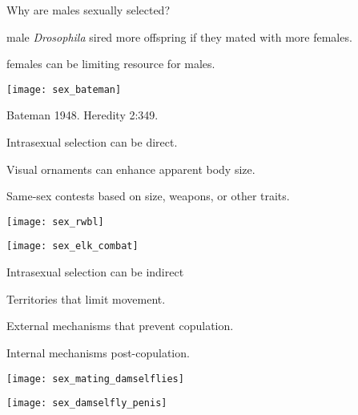 \documentclass[t]{beamer}
\newcommand{\backskip}{\vspace{-0.5\baselineskip}}
\begin{document}

\begin{frame}{Why are males sexually selected?}

\backskip

\begin{multicols}{2}
	\hangpara {} male \textit{Drosophila} sired more offspring if they mated with more females.

	\hangpara {} females can be limiting resource for males.

	\hangpara {}
	
\columnbreak

\texttt{[image: sex\_bateman]}

\end{multicols}

\vfilll

\tinyfill Bateman 1948. Heredity 2:349. 

\end{frame}


\begin{frame}{Intrasexual selection can be direct.}

\backskip

\begin{multicols}{2}
\hangpara Visual ornaments can enhance apparent body size.

\vspace{6\baselineskip}

\hangpara Same-sex contests based on size, weapons, or other traits.

\columnbreak

\centering

\texttt{[image: sex\_rwbl]}

\smallskip

\texttt{[image: sex\_elk\_combat]}

\end{multicols}
	

	
\end{frame}


\begin{frame}{Intrasexual selection can be indirect}
\backskip

\begin{multicols}{2}
\hangpara Territories that limit movement.

\hangpara External mechanisms that prevent copulation.

\hangpara Internal mechanisms post-copulation.

\columnbreak

\centering

\texttt{[image: sex\_mating\_damselflies]}

\smallskip

\texttt{[image: sex\_damselfly\_penis]}

\end{multicols}
	
\end{frame}
\end{document}
